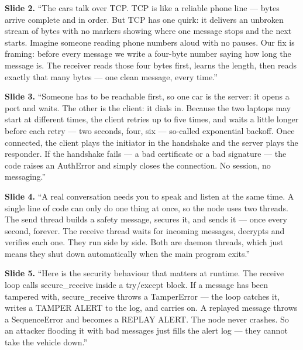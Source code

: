 \documentclass[11pt,a4paper]{report}
\begin{document}
\textbf{Slide 2.} ``The cars talk over TCP. TCP is like a reliable phone line ---
bytes arrive complete and in order. But TCP has one quirk: it delivers an
unbroken stream of bytes with no markers showing where one message stops and the
next starts. Imagine someone reading phone numbers aloud with no pauses. Our fix
is framing: before every message we write a four-byte number saying how long the
message is. The receiver reads those four bytes first, learns the length, then
reads exactly that many bytes --- one clean message, every time.''

\textbf{Slide 3.} ``Someone has to be reachable first, so one car is the server:
it opens a port and waits. The other is the client: it dials in. Because the two
laptops may start at different times, the client retries up to five times, and
waits a little longer before each retry --- two seconds, four, six --- so-called
exponential backoff. Once connected, the client plays the initiator in the
handshake and the server plays the responder. If the handshake fails --- a bad
certificate or a bad signature --- the code raises an AuthError and simply closes
the connection. No session, no messaging.''

\textbf{Slide 4.} ``A real conversation needs you to speak and listen at the same
time. A single line of code can only do one thing at once, so the node uses two
threads. The send thread builds a safety message, secures it, and sends it ---
once every second, forever. The receive thread waits for incoming messages,
decrypts and verifies each one. They run side by side. Both are daemon threads,
which just means they shut down automatically when the main program exits.''

\textbf{Slide 5.} ``Here is the security behaviour that matters at runtime. The
receive loop calls secure\_receive inside a try/except block. If a message has
been tampered with, secure\_receive throws a TamperError --- the loop catches it,
writes a TAMPER ALERT to the log, and carries on. A replayed message throws a
SequenceError and becomes a REPLAY ALERT. The node never crashes. So an attacker
flooding it with bad messages just fills the alert log --- they cannot take the
vehicle down.''
\end{document}
